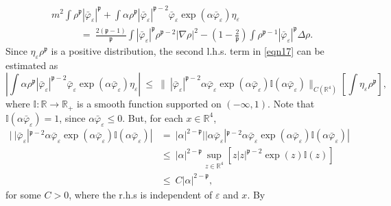 \documentclass{article}
\begin{document}
%
\begin{align}
    & m^2 \int \rho^{\mathfrak{p}} | \bar{\varphi}_{\varepsilon}
    |^{\mathfrak{p}} + \int \alpha \rho^{\mathfrak{p}} |
    \bar{\varphi}_{\varepsilon} |^{\mathfrak{p}- 2}
    \bar{\varphi}_{\varepsilon} \exp (\alpha \bar{\varphi}_{\varepsilon})
    \eta_{\varepsilon} \nonumber \\
    & \qquad \quad = ~ \frac{2 (\mathfrak{p}- 1)}{\mathfrak{p}} \int |
    \bar{\varphi}_{\varepsilon} |^{\mathfrak{p}} \rho^{\mathfrak{p}- 2} |
    \nabla \rho |^2 - \left( 1 - \frac{2}{\mathfrak{p}} \right) \int
    \rho^{\mathfrak{p}- 1} | \bar{\varphi}_{\varepsilon} |^{\mathfrak{p}}
    \Delta \rho .
  \label{eqn17}
\end{align}
%
Since $\eta_{\varepsilon} \rho^{\mathfrak{p}}$ is a positive distribution, the second l.h.s. term in \eqref{eqn17} can be estimated as
%
\begin{equation*}
    \left| \int \alpha \rho^{\mathfrak{p}} | \bar{\varphi}_{\varepsilon}
     |^{\mathfrak{p}- 2}  \bar{\varphi}_{\varepsilon} \exp (\alpha
     \bar{\varphi}_{\varepsilon}) \eta_{\varepsilon} \right| ~\leq~ \| ~ |
     \bar{\varphi}_{\varepsilon} |^{\mathfrak{p}- 2} \alpha
     \bar{\varphi}_{\varepsilon} \exp (\alpha \bar{\varphi}_{\varepsilon})
     \mathbb{I} (\alpha \bar{\varphi}_{\varepsilon}) \|_{C (\mathbb{R}^4)}
     \left[ \int \eta_{\varepsilon} \rho^{\mathfrak{p}} \right],
\end{equation*}
%
where $\mathbb{I}: \mathbb{R} \rightarrow \mathbb{R}_+$ is a smooth function supported on $(- \infty, 1)$. Note that $\mathbb{I} (\alpha
\bar{\varphi}_{\varepsilon}) = 1$,  since $\alpha \bar{\varphi}_{\varepsilon}
\leqslant 0$. But, for each $x \in \mathbb{R}^4$,
%
\begin{align*}
    | ~ | \bar{\varphi}_{\varepsilon} |^{\mathfrak{p}- 2} \alpha
     \bar{\varphi}_{\varepsilon} \exp (\alpha \bar{\varphi}_{\varepsilon})
     \mathbb{I} (\alpha \bar{\varphi}_{\varepsilon}) |  & =~  | \alpha |^{2
     -\mathfrak{p}} | | \alpha \bar{\varphi}_{\varepsilon} |^{\mathfrak{p}- 2}
     \alpha \bar{\varphi}_{\varepsilon} \exp (\alpha
     \bar{\varphi}_{\varepsilon}) \mathbb{I} (\alpha
     \bar{\varphi}_{\varepsilon}) | \\
     & \leq  ~ | \alpha |^{2 -\mathfrak{p}} \sup_{z \in \mathbb{R}^4} [z
     | z |^{\mathfrak{p}- 2} \exp (z) \mathbb{I} (z)]\\
     & \leq  ~ C | \alpha |^{2 -\mathfrak{p}},
\end{align*}
for some $C > 0$, where the r.h.s is independent of $\varepsilon$ and $x$. By
\end{document}

